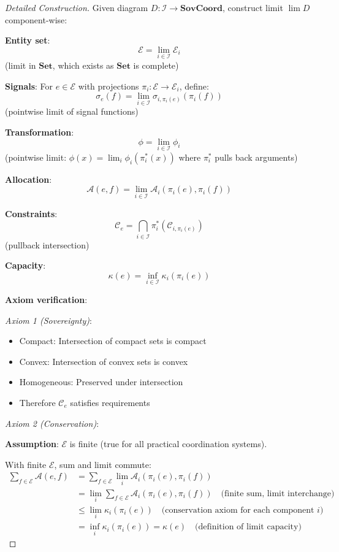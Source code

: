\documentclass[11pt,a4paper]{article}
\theoremstyle{definition}
\theoremstyle{remark}
\newcommand{\E}{\mathcal{E}}
\newcommand{\A}{\mathcal{A}}
\newcommand{\C}{\mathcal{C}}
\newcommand{\SovCoord}{\mathbf{SovCoord}}
\begin{document}
\begin{proof}[Detailed Construction]
Given diagram $D: \mathcal{I} \to \SovCoord$, construct limit $\lim D$ component-wise:

\textbf{Entity set}:
\[ \E = \lim_{i \in \mathcal{I}} \E_i \]
(limit in $\mathbf{Set}$, which exists as $\mathbf{Set}$ is complete)

\textbf{Signals}: For $e \in \E$ with projections $\pi_i: \E \to \E_i$, define:
\[ \sigma_e(f) = \lim_{i \in \mathcal{I}} \sigma_{i,\pi_i(e)}(\pi_i(f)) \]
(pointwise limit of signal functions)

\textbf{Transformation}: 
\[ \phi = \lim_{i \in \mathcal{I}} \phi_i \]
(pointwise limit: $\phi(x) = \lim_i \phi_i(\pi_i^*(x))$ where $\pi_i^*$ pulls back arguments)

\textbf{Allocation}:
\[ \A(e,f) = \lim_{i \in \mathcal{I}} \A_i(\pi_i(e), \pi_i(f)) \]

\textbf{Constraints}:
\[ \C_e = \bigcap_{i \in \mathcal{I}} \pi_i^*(\C_{i,\pi_i(e)}) \]
(pullback intersection)

\textbf{Capacity}:
\[ \kappa(e) = \inf_{i \in \mathcal{I}} \kappa_i(\pi_i(e)) \]

\textbf{Axiom verification}:

\textit{Axiom 1 (Sovereignty)}: 
\begin{itemize}
\item Compact: Intersection of compact sets is compact
\item Convex: Intersection of convex sets is convex
\item Homogeneous: Preserved under intersection
\item Therefore $\C_e$ satisfies requirements
\end{itemize}

\textit{Axiom 2 (Conservation)}:

\textbf{Assumption}: $\E$ is finite (true for all practical coordination systems).

With finite $\E$, sum and limit commute:
\begin{align*}
\sum_{f \in \E} \A(e,f) &= \sum_{f \in \E} \lim_i \A_i(\pi_i(e), \pi_i(f)) \\
&= \lim_i \sum_{f \in \E} \A_i(\pi_i(e), \pi_i(f)) \quad \text{(finite sum, limit interchange)} \\
&\le \lim_i \kappa_i(\pi_i(e)) \quad \text{(conservation axiom for each component $i$)} \\
&= \inf_i \kappa_i(\pi_i(e)) = \kappa(e) \quad \text{(definition of limit capacity)}
\end{align*}


\end{proof}
\end{document}
